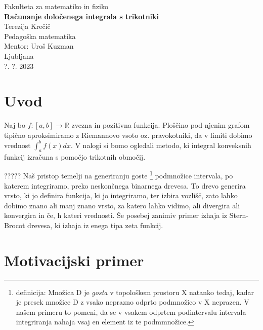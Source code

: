 \documentclass[a4paper, 12pt, titlepage]{article}
\begin{document}
\begin{titlepage}
    \begin{center}
        \large
        Fakulteta za matematiko in fiziko\\
        \vspace{8cm}
        \Huge
        \textbf{Računanje določenega integrala s trikotniki} \\
        \vspace{7cm}
        \large
        Terezija Krečič\\
        Pedagoška matematika\\
        \vspace{1cm}
        Mentor: Uroš Kuzman\\
        \vspace{0.5cm}
        Ljubljana\\
        ?. ?. 2023
    \end{center}
\end{titlepage}

\tableofcontents
\newpage

\section{Uvod}

Naj bo $ f: [a,b] \rightarrow \mathbb{R} $ zvezna in pozitivna funkcija. Ploščino pod njenim grafom tipično aproksimiramo z Riemannovo vsoto oz. pravokotniki, da v limiti dobimo vrednost $ \int_{a}^{b}f(x)dx $. V nalogi si bomo ogledali metodo, ki integral konveksnih funkcij izračuna s pomočjo trikotnih območij.

????? Naš pristop temelji na generiranju goste \footnote{definicija: Množica D je \emph{gosta} v topološkem prostoru X natanko tedaj, kadar je presek množice D z vsako neprazno odprto podmnožico v X neprazen. V našem primeru to pomeni, da se v vsakem odprtem podintervalu intervala integriranja nahaja vsaj en element iz te podmmnožice.} podmnožice intervala, po katerem integriramo, preko neskončnega binarnega drevesa. To drevo generira vrsto, ki jo definira funkcija, ki jo integriramo, ter izbira vozlišč, zato lahko dobimo znano ali manj znano vrsto, za katero lahko vidimo, ali divergira ali konvergira in če, h kateri vrednosti. Še posebej zanimiv primer izhaja iz Stern-Brocot drevesa, ki izhaja iz enega tipa zeta funkcij.


\newpage
\section{Motivacijski primer}
\end{document}
